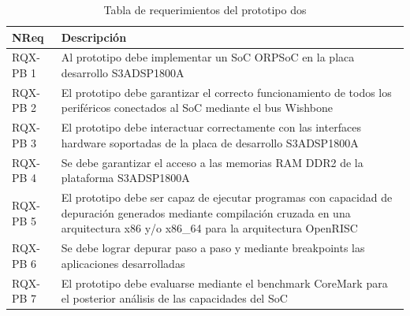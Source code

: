 		\begin{table}[h!]
		\centering
		\begin{tabular}{ p{2.5cm} p{14.5cm} }
		\hline 
		\rowcolor[gray]{0.8} N\textordmasculine Req & Descripción\\
		\hline 
		RQX-PB 1 & Al prototipo debe implementar un SoC ORPSoC en la placa desarrollo S3ADSP1800A\\ 
		\hline 
		RQX-PB 2 & El prototipo debe garantizar el correcto funcionamiento de todos los periféricos conectados al SoC mediante el bus Wishbone\\ 
		\hline 
		RQX-PB 3 & El prototipo debe interactuar correctamente con las interfaces hardware soportadas de la placa de desarrollo S3ADSP1800A\\ 
		\hline
		RQX-PB 4 & Se debe garantizar el acceso a las memorias RAM DDR2 de la plataforma S3ADSP1800A\\
		\hline
		RQX-PB 5 & El prototipo debe ser capaz de ejecutar programas con capacidad de depuración generados mediante compilación
		cruzada en una arquitectura x86 y/o x86\_64 para la arquitectura OpenRISC\\
		\hline
		RQX-PB 6 & Se debe lograr depurar paso a paso y mediante breakpoints las aplicaciones desarrolladas\\
		\hline
		RQX-PB 7 & El prototipo debe evaluarse mediante el benchmark CoreMark para el posterior análisis de las capacidades del SoC\\
		\hline		
		\end{tabular}
		\caption{Tabla de requerimientos del prototipo dos}
		\label{tab:tdr2}
		\end{table}


